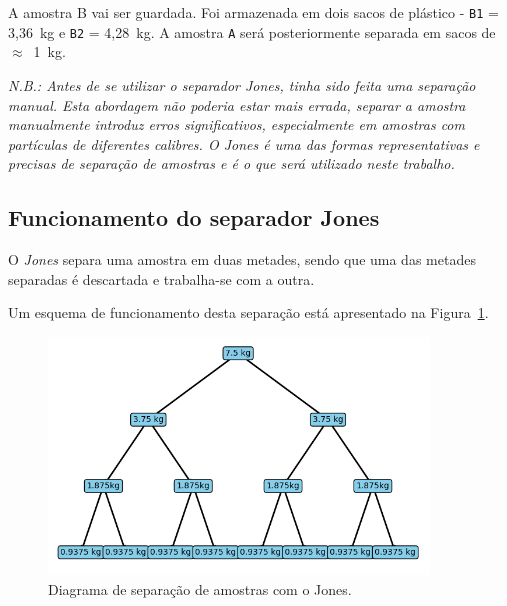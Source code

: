 A amostra B vai ser guardada.
Foi armazenada em dois sacos de plástico - \texttt{B1} = 3,36~kg e \texttt{B2} = 4,28~kg.
A amostra \texttt{A} será posteriormente separada em sacos de $\approx$~1~kg.

\hrulefill
\pagebreak


\textit{N.B.: Antes de se utilizar o separador \emph{Jones}, tinha sido feita uma separação manual. Esta abordagem não poderia estar mais errada, separar a amostra manualmente introduz erros significativos, especialmente em amostras com partículas de diferentes calibres. O Jones é uma das formas representativas e precisas de separação de amostras e é o que será utilizado neste trabalho.}


\subsection{Funcionamento do separador Jones}\label{subsec:funcionamento-do-separador-jones}

O \emph{Jones} separa uma amostra em duas metades, sendo que uma das metades separadas é descartada e trabalha-se com a outra.

Um esquema de funcionamento desta separação está apresentado na Figura~\ref{fig:diagrama_jones}.

\begin{figure}[!ht]
    \centering
    \includegraphics[width=0.9\textwidth]{figures/diagrama_jones}
    \caption{Diagrama de separação de amostras com o Jones.}
    \label{fig:diagrama_jones}
\end{figure}

